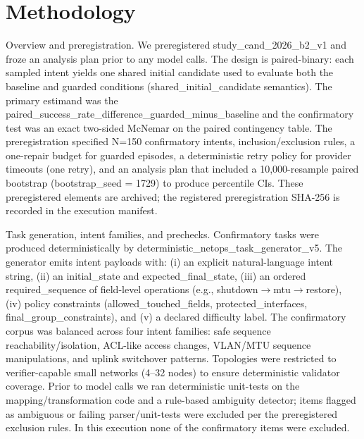 \documentclass[conference]{IEEEtran}
\begin{document}
\section{Methodology}
Overview and preregistration. We preregistered study\_cand\_2026\_b2\_v1 and froze an analysis plan prior to any model calls. The design is paired-binary: each sampled intent yields one shared initial candidate used to evaluate both the baseline and guarded conditions (shared\_initial\_candidate semantics). The primary estimand was the paired\_success\_rate\_difference\_guarded\_minus\_baseline and the confirmatory test was an exact two-sided McNemar on the paired contingency table. The preregistration specified N=150 confirmatory intents, inclusion/exclusion rules, a one-repair budget for guarded episodes, a deterministic retry policy for provider timeouts (one retry), and an analysis plan that included a 10,000-resample paired bootstrap (bootstrap\_seed = 1729) to produce percentile CIs. These preregistered elements are archived; the registered preregistration SHA-256 is recorded in the execution manifest.

Task generation, intent families, and prechecks. Confirmatory tasks were produced deterministically by deterministic\_netops\_task\_generator\_v5. The generator emits intent payloads with: (i) an explicit natural-language intent string, (ii) an initial\_state and expected\_final\_state, (iii) an ordered required\_sequence of field-level operations (e.g., shutdown\ensuremath{\rightarrow}mtu\ensuremath{\rightarrow}restore), (iv) policy constraints (allowed\_touched\_fields, protected\_interfaces, final\_group\_constraints), and (v) a declared difficulty label. The confirmatory corpus was balanced across four intent families: safe sequence reachability/isolation, ACL-like access changes, VLAN/MTU sequence manipulations, and uplink switchover patterns. Topologies were restricted to verifier-capable small networks (4--32 nodes) to ensure deterministic validator coverage. Prior to model calls we ran deterministic unit-tests on the mapping/transformation code and a rule-based ambiguity detector; items flagged as ambiguous or failing parser/unit-tests were excluded per the preregistered exclusion rules. In this execution none of the confirmatory items were excluded.
\end{document}
